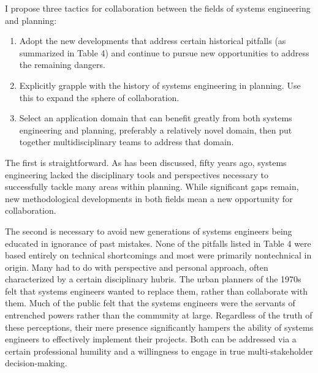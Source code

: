 \restoregeometry

I propose three tactics for collaboration between the fields of systems engineering and planning:

\begin{enumerate} \setlength{\itemsep}{0pt} \setlength{\parskip}{0pt} 
	\item{Adopt the new developments that address certain historical pitfalls (as summarized in Table 4) and continue to pursue new opportunities to address the remaining dangers.}
	\item{Explicitly grapple with the history of systems engineering in planning. Use this to expand the sphere of collaboration.}
	\item{Select an application domain that can benefit greatly from both systems engineering and planning, preferably a relatively novel domain, then put together multidisciplinary teams to address that domain.}
\end{enumerate}

The first is straightforward. As has been discussed, fifty years ago, systems engineering lacked the disciplinary tools and perspectives necessary to successfully tackle many areas within planning. While significant gaps remain, new methodological developments in both fields mean a new opportunity for collaboration.

The second is necessary to avoid new generations of systems engineers being educated in ignorance of past mistakes. None of the pitfalls listed in Table 4 were based entirely on technical shortcomings and most were primarily nontechnical in origin. Many had to do with perspective and personal approach, often characterized by a certain disciplinary hubris. The urban planners of the 1970s felt that systems engineers wanted to replace them, rather than collaborate with them. Much of the public felt that the systems engineers were the servants of entrenched powers rather than the community at large. Regardless of the truth of these perceptions, their mere presence significantly hampers the ability of systems engineers to effectively implement their projects. Both can be addressed via a certain professional humility and a willingness to engage in true multi-stakeholder decision-making. 


